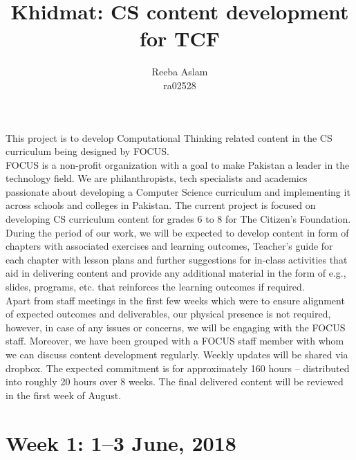 \documentclass{article}
\title {Khidmat: CS content development for TCF}
\author{
  Reeba Aslam\\ra02528 
}
\date{}
\begin{document}
\maketitle


This project is to develop Computational Thinking related content in the CS curriculum being designed by FOCUS.\\

FOCUS is a non-profit organization with a goal to make Pakistan a leader in the technology field. We are philanthropists, tech specialists and academics passionate about developing a Computer Science curriculum and implementing it across schools and colleges in Pakistan.
The current project is focused on developing CS curriculum content for grades 6 to 8 for The Citizen's Foundation. \\

During the period of our work, we will be expected to develop content in form of chapters with associated exercises and learning outcomes, Teacher’s guide for each chapter with lesson plans and further suggestions for in-class activities that aid in delivering content and provide any additional material in the form of e.g., slides, programs, etc. that reinforces the learning outcomes if required.\\

Apart from staff meetings in the first few weeks which were to ensure alignment of expected outcomes and deliverables, our physical presence is not required, however, in case of any issues or concerns, we will be engaging with the FOCUS staff. 
Moreover, we have been grouped with a FOCUS staff member with whom we can discuss content development regularly. Weekly updates will be shared via dropbox. The expected commitment is for approximately 160 hours – distributed into roughly 20 hours over 8 weeks. The final delivered content will be reviewed in the first week of August.

\newpage %
\section*{Week 1: 1--3 June, 2018}
\end{document}
